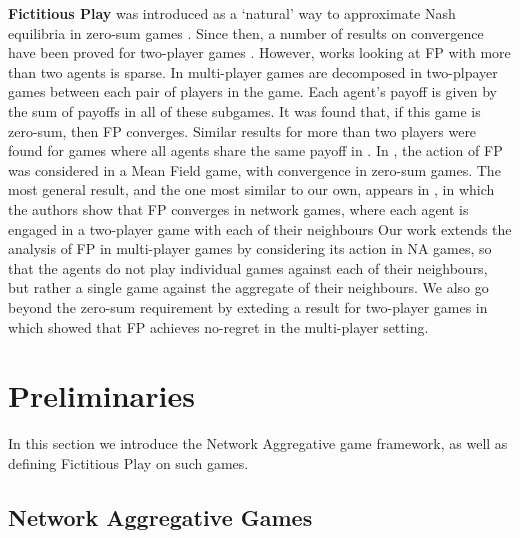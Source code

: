 \documentclass{article}
\theoremstyle{definition}
\begin{document}
\textbf{Fictitious Play} was introduced
as a `natural' way to approximate Nash equilibria in zero-sum games
\cite{Brown1949}. Since then, a number of results on convergence have
been proved for two-player games \cite{Robinson1951, Miyasawa1961,
  Metrick1994,Berger2007, Monderer1997, Monderer1996}. However, 
works looking at FP with more than two agents is
sparse. In \cite{Sela1999}
multi-player games
are decomposed
in two-plpayer games between each pair of players in the game.
Each agent's payoff is given by the sum of
payoffs in all of these subgames. It was found that, if this game is
zero-sum, then FP converges. Similar results for more than two
players were found for games where all agents share the same payoff in
\cite{Monderer1996}. In \cite{Perrin2020}, the action of FP was
considered in a Mean Field game, with convergence in zero-sum
games. The most general result, and the one most similar to our own,
appears in
\cite{Ewerhart2020}, in which the authors show
that FP converges in network games, where each agent is
engaged in a two-player game with each of their neighbours
Our work extends the analysis
of FP in multi-player games by considering its action in NA games,
so that the agents do not play
individual games against each of their neighbours, but rather a single
game against the aggregate of their neighbours. We also go beyond the
zero-sum requirement by exteding a result for two-player games
in \cite{Ostrovski2014} which showed that FP achieves no-regret in the
multi-player setting.

\section{Preliminaries}
In this section we introduce the Network Aggregative game framework,
as well as defining Fictitious Play on such games.

\subsection{Network Aggregative Games}
\label{sec::NAG}
\end{document}
